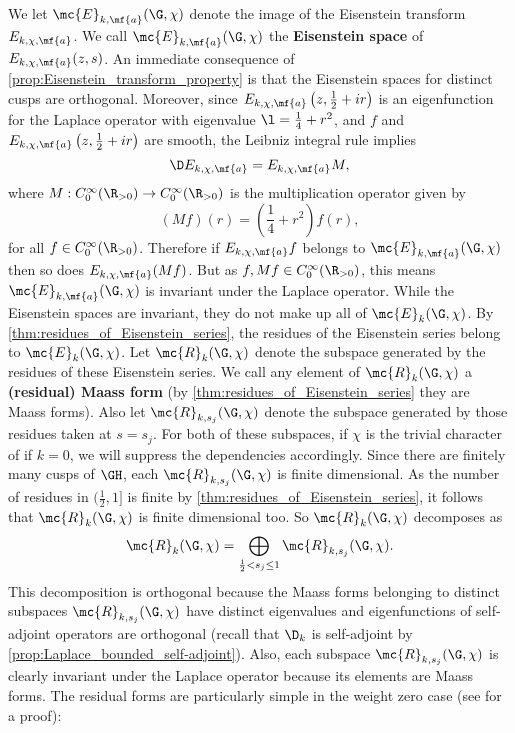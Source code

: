     We let $\mc{E}_{k,\mf{a}}(\G,\chi)$ denote the image of the Eisenstein transform $E_{k,\chi,\mf{a}}$. We call $\mc{E}_{k,\mf{a}}(\G,\chi)$ the \textbf{Eisenstein space} of $E_{k,\chi,\mf{a}}(z,s)$. An immediate consequence of \cref{prop:Eisenstein_transform_property} is that the Eisenstein spaces for distinct cusps are orthogonal. Moreover, since $E_{k,\chi,\mf{a}}\left(z,\frac{1}{2}+ir\right)$ is an eigenfunction for the Laplace operator with eigenvalue $\l = \frac{1}{4}+r^{2}$, and $f$ and $E_{k,\chi,\mf{a}}\left(z,\frac{1}{2}+ir\right)$ are smooth, the Leibniz integral rule implies
    \[
      \D E_{k,\chi,\mf{a}}= E_{k,\chi,\mf{a}}M,
    \]
    where $M:C_{0}^{\infty}(\R_{> 0}) \to C_{0}^{\infty}(\R_{> 0})$ is the multiplication operator given by
    \[
      (Mf)(r) = \left(\frac{1}{4}+r^{2}\right)f(r),
    \]
    for all $f \in C_{0}^{\infty}(\R_{> 0})$. Therefore if $E_{k,\chi,\mf{a}}f$ belongs to $\mc{E}_{k,\mf{a}}(\G,\chi)$ then so does $E_{k,\chi,\mf{a}}(Mf)$. But as $f,Mf \in C_{0}^{\infty}(\R_{> 0})$, this means $\mc{E}_{k,\mf{a}}(\G,\chi)$ is invariant under the Laplace operator. While the Eisenstein spaces are invariant, they do not make up all of $\mc{E}_{k}(\G,\chi)$. By \cref{thm:residues_of_Eisenstein_series}, the residues of the Eisenstein series belong to $\mc{E}_{k}(\G,\chi)$. Let $\mc{R}_{k}(\G,\chi)$ denote the subspace generated by the residues of these Eisenstein series. We call any element of $\mc{R}_{k}(\G,\chi)$ a \textbf{(residual) Maass form} (by \cref{thm:residues_of_Eisenstein_series} they are Maass forms). Also let $\mc{R}_{k,s_{j}}(\G,\chi)$ denote the subspace generated by those residues taken at $s = s_{j}$. For both of these subspaces, if $\chi$ is the trivial character of if $k = 0$, we will suppress the dependencies accordingly. Since there are finitely many cusps of $\GH$, each $\mc{R}_{k,s_{j}}(\G,\chi)$ is finite dimensional. As the number of residues in $(\frac{1}{2},1]$ is finite by \cref{thm:residues_of_Eisenstein_series}, it follows that $\mc{R}_{k}(\G,\chi)$ is finite dimensional too. So $\mc{R}_{k}(\G,\chi)$ decomposes as
    \[
      \mc{R}_{k}(\G,\chi) = \bigoplus_{\frac{1}{2} < s_{j} \le 1}\mc{R}_{k,s_{j}}(\G,\chi).
    \]
    This decomposition is orthogonal because the Maass forms belonging to distinct subspaces $\mc{R}_{k,s_{j}}(\G,\chi)$ have distinct eigenvalues and eigenfunctions of self-adjoint operators are orthogonal (recall that $\D_{k}$ is self-adjoint by \cref{prop:Laplace_bounded_self-adjoint}). Also, each subspace $\mc{R}_{k,s_{j}}(\G,\chi)$ is clearly invariant under the Laplace operator because its elements are Maass forms. The residual forms are particularly simple in the weight zero case (see \cite{iwaniec2002spectral} for a proof):


